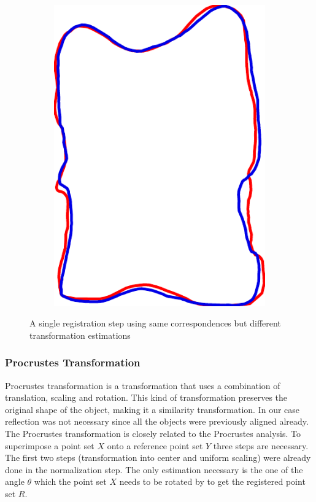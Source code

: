 \documentclass[pdftex,12pt,a4paper]{report}
\begin{document}
\begin{figure}[h]
\begin{subfigure}[b]{0.24\textwidth}
		\includegraphics[width=.9\linewidth]{img/registration/single-projective.pdf}
	\end{subfigure}
	\caption{A single registration step using same correspondences but different transformation estimations}
	\label{fig:slic}
\end{figure}

\subsubsection{Procrustes Transformation}
\label{subsub:procrustes}

Procrustes transformation is a transformation that uses a combination of translation, scaling and rotation. This kind of
transformation preserves the original shape of the object, making it a similarity transformation. In our case reflection
was not necessary since all the objects were previously aligned already. The Procrustes transformation is closely related to the
Procrustes analysis. To superimpose a point set $X$ onto a reference point set $Y$ three steps are necessary. The first
two steps (transformation into center and uniform scaling) were already done in the normalization step. The only
estimation necessary is the one of the angle $\theta$ which the point set $X$ needs to be rotated by to get the registered
point set $R$.
\end{document}

